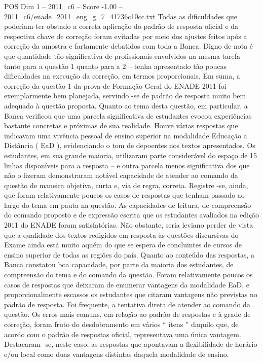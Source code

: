 \begin{textsample}{POS Dim 1 – 2011\_c6 – Score -1.00 – 2011\_c6/enade\_2011\_eng\_g\_7\_41736c10cc.txt}
Todas as dificuldades que poderiam ter obstado a correta aplicação do padrão de resposta oficial e da respectiva chave de correção foram evitadas por meio dos ajustes feitos após a correção da amostra e fartamente debatidos com toda a Banca.
Digno de nota é que quantidade tão significativa de profissionais envolvidos na mesma tarefa – tanto para a questão 1 quanto para a 2 – tenha apresentado tão poucas dificuldades na execução da correção, em termos proporcionais.
Em suma, a correção da questão 1 da prova de Formação Geral do ENADE 2011 foi exemplarmente bem planejada, servindo -se de padrão de resposta muito bem adequado à questão proposta.
Quanto ao tema desta questão, em particular, a Banca verificou que uma parcela significativa de estudantes evocou experiências bastante concretas e próximas de sua realidade.
Houve várias respostas que indicavam uma vivência pessoal de ensino superior na modalidade Educação a Distância ( EaD ), evidenciando o tom de depoentes nos textos apresentados.
Os estudantes, em sua grande maioria, utilizaram parte considerável do espaço de 15 linhas disponíveis para a resposta – e outra parcela menos significativa dos que não o fizeram demonstraram notável capacidade de atender ao comando da questão de maneira objetiva, curta e, via de regra, correta.
Registre -se, ainda, que foram relativamente poucos os casos de respostas que tenham passado ao largo do tema em pauta na questão.
As capacidades de leitura, de compreensão do comando proposto e de expressão escrita que os estudantes avaliados na edição 2011 do ENADE foram satisfatórias.
Não obstante, seria leviano perder de vista que a qualidade dos textos redigidos em resposta às questões discursivas do Exame ainda está muito aquém do que se espera de concluintes de cursos de ensino superior de todas as regiões do país.
Quanto ao conteúdo das respostas, a Banca constatou boa capacidade, por parte da maioria dos estudantes, de compreensão do tema e do comando da questão.
Foram relativamente poucos os casos de respostas que deixaram de enumerar vantagens da modalidade EaD, e proporcionalmente escassos os estudantes que citaram vantagens não previstas no padrão de resposta.
Foi frequente, a tentativa direta de atender ao comando da questão.
Os erros mais comuns, em relação ao padrão de respostas e à grade de correção, foram fruto do desdobramento em vários “ itens ” daquilo que, de acordo com o padrão de respostas oficial, representava uma única vantagem.
Destacaram -se, neste caso, as respostas que apontavam a flexibilidade de horário e/ou local como duas vantagens distintas daquela modalidade de ensino.

\end{textsample}
